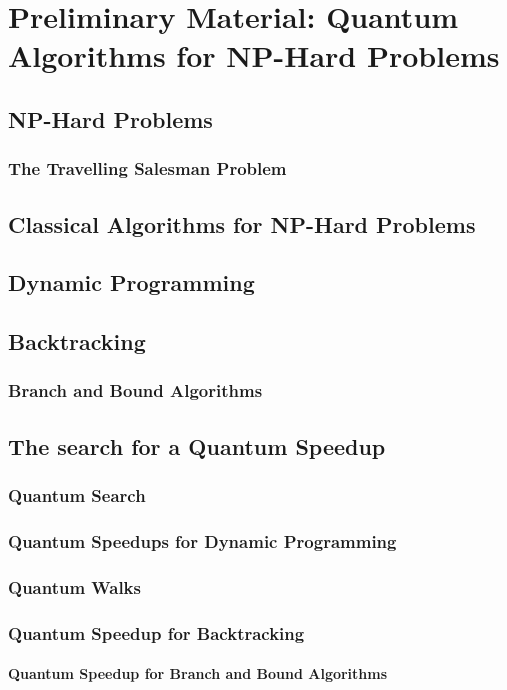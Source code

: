 \chapter{Preliminary Material: Quantum Algorithms for NP-Hard Problems}

\section{NP-Hard Problems}

\subsection{The Travelling Salesman Problem}

\section{Classical Algorithms for NP-Hard Problems}

\section{Dynamic Programming}

\section{Backtracking}

\subsection{Branch and Bound Algorithms}

\section{The search for a Quantum Speedup}

\subsection{Quantum Search}

\subsection{Quantum Speedups for Dynamic Programming}

\subsection{Quantum Walks}

\subsection{Quantum Speedup for Backtracking}

\subsubsection{Quantum Speedup for Branch and Bound Algorithms}